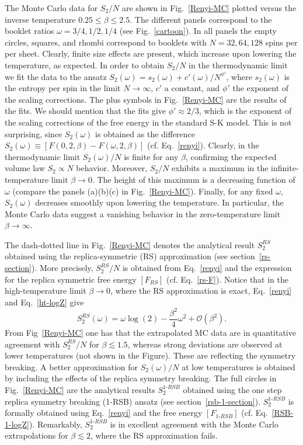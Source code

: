 \documentclass[twocolumn,superscriptaddress,prb,10pt]{revtex4-1}
\begin{document}
The Monte Carlo data for $S_2/N$  are shown in Fig.~\ref{Renyi-MC} plotted versus the 
inverse temperature $0.25\le\beta\le 2.5$. The different panels correspond to the  
booklet ratios $\omega=3/4,1/2,1/4$ (see Fig.~\ref{cartoon}). In all panels the empty 
circles, squares, and rhombi correspond to booklets with $N=32,64,128$ spins per per 
sheet. Clearly, finite size effects are present, which increase upon lowering 
the temperature, as expected. In order to obtain $S_2/N$ in the thermodynamic limit 
we fit the data to the ansatz $S_2(\omega)=s_2(\omega)+c'(\omega)/N^{\phi'}$, where 
$s_2(\omega)$ is the entropy per spin in the limit $N\to\infty$, $c'$ a constant, and 
$\phi'$ the exponent of the scaling corrections. The plus symbols in Fig.~\ref{Renyi-MC} 
are the results of the fits. We should mention that the fits give $\phi'\approx 2/3$, 
which is the exponent of the scaling corrections of the free energy in the standard 
S-K model. This is not surprising, since $S_2(\omega)$ is obtained as the difference 
$S_2(\omega)\equiv [F(0,2,\beta)-F(\omega,2,\beta)]$ (cf. Eq.~\eqref{renyi}). 
Clearly, in the thermodynamic limit $S_2(\omega)/N$ is finite for any $\beta$, 
confirming the expected volume law $S_2\propto N$ behavior. Moreover, $S_2/N$ 
exhibits a maximum in the infinite-temperature limit $\beta\to0$. The height of this 
maximum  is a decreasing function of $\omega$ (compare the panels (a)(b)(c) in 
Fig.~\ref{Renyi-MC}). Finally, for any fixed $\omega$, $S_2(\omega)$ decreases 
smoothly upon lowering the temperature. In particular, the Monte Carlo data suggest 
a vanishing behavior in the zero-temperature limit $\beta\to\infty$. 

The dash-dotted line in Fig.~\ref{Renyi-MC} denotes the analytical result $S_2^{RS}$ 
obtained using the replica-symmetric (RS) approximation (see section~\ref{rs-section}).
More precisely, $S_2^{RS}/N$ is obtained from Eq.~\eqref{renyi} and the expression for 
the replica symmetric free energy $[F_{RS}]$ (cf. Eq.~\eqref{rs-F}). Notice that in the 
high-temperature limit $\beta\to0$, where the RS approximation is exact, 
Eq.~\eqref{renyi} and Eq.~\eqref{ht-logZ} give 
%
\begin{equation}
S^{RS}_2(\omega)=\omega\log(2)-\frac{\beta^2}{4}\omega^2+{\mathcal O}(\beta^2).
\end{equation}
%
From Fig~\ref{Renyi-MC} one has that the extrapolated MC data are in quantitative 
agreement with $S_2^{RS}/N$ for $\beta\lesssim 1.5$, whereas strong deviations are 
observed at lower temperatures (not shown in the Figure). 
These are reflecting the symmetry breaking. A better approximation for $S_2(\omega)/N$ 
at low temperatures is obtained by including the effects of the replica symmetry breaking. 
The full circles in Fig.~\ref{Renyi-MC} are the analytical results $S_2^{1\textrm{-}RSB}$
obtained using the one step replica symmetry breaking (1-RSB) ansatz 
(see section~\ref{rsb-1-section}). $S_2^{1\textrm{-}RSB}$ is formally obtained 
using Eq.~\eqref{renyi} and the free energy $[F_{1\textrm{-}RSB}]$ (cf. 
Eq.~\eqref{RSB-1-logZ}). Remarkably,  $S_2^{1\textrm{-}RSB}$ is in excellent 
agreement with the Monte Carlo extrapolations for $\beta\lesssim 2$, where the RS 
approximation fails. 
\end{document}
